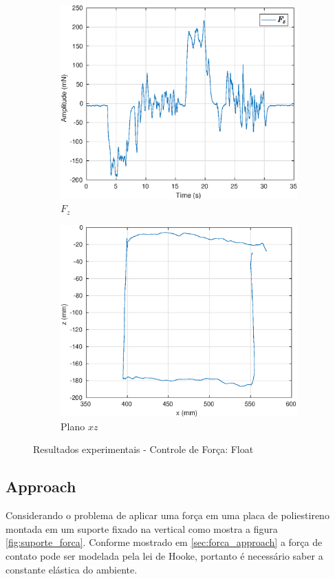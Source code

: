 \begin{figure}[H]
\begin{subfigure}{.5\textwidth}
  \centering
  \includegraphics[width=\linewidth]{./img/float2/Fz.eps}
  \caption{$F_z$}
  \label{fig:sub1}
\end{subfigure}%
\begin{subfigure}{.5\textwidth}
  \centering
  \includegraphics[width=\linewidth]{./img/float2/xz.eps}
  \caption{Plano $xz$}
  \label{fig:sub2}
\end{subfigure}
\caption{Resultados experimentais - Controle de Força: Float}
\label{fig:test}
\end{figure}

\subsection{Approach}
Considerando o problema de aplicar uma força em uma placa de poliestireno montada em um suporte fixado na vertical como mostra a figura \ref{fig:suporte_forca}.  Conforme mostrado em \ref{sec:forca_approach} a força de contato pode ser modelada pela lei de Hooke, portanto é necessário saber a constante elástica do ambiente.


